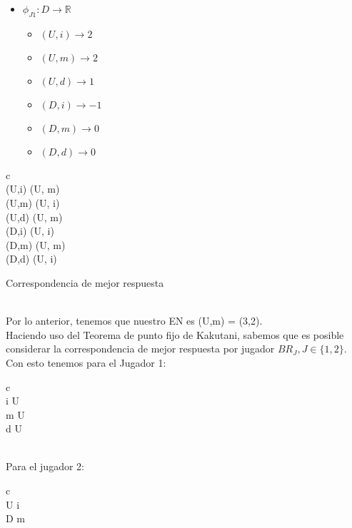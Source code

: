 \documentclass{homework}
\begin{document}
\begin{enumerate}
\begin{itemize}
            \item $\phi_{J1} : D \rightarrow \mathbb R$
            \begin{itemize}
                \item $(U,i) \rightarrow 2$
                \item $(U,m) \rightarrow 2$ 
                \item $(U,d) \rightarrow 1$ 
                \item $(D,i) \rightarrow -1$
                \item $(D,m) \rightarrow 0$
                \item $(D,d) \rightarrow 0$
            \end{itemize}
            
        \end{itemize}
        
\begin{center}
\begin{tabular}{ c   }
 \\ \hline
(U,i) \longrightarrow (U, m) \\
(U,m) \longrightarrow (U, i) \\
(U,d) \longrightarrow (U, m) \\
(D,i) \longrightarrow (U, i) \\
(D,m) \longrightarrow (U, m) \\
(D,d) \longrightarrow (U, i) \\
\end{tabular}
\caption{Correspondencia de mejor respuesta}
\label{tab:respuesta}
\end{center}\\

Por lo anterior, tenemos que nuestro EN es (U,m) = (3,2).\\
Haciendo uso del Teorema de punto fijo de Kakutani, sabemos que es posible considerar la correspondencia de mejor respuesta por jugador $BR_J, J\in \{1,2\}$. Con esto tenemos para el Jugador 1:

\begin{center}
\begin{tabular}{c  }
 \\ \hline
i \longrightarrow U \\
m \longrightarrow U \\
d \longrightarrow U \\
\end{tabular}
\end{center}\\
Para el jugador 2:
\begin{center}
\begin{tabular}{c  }
 \\ \hline
U \longrightarrow i \\
D \longrightarrow m \\
\end{tabular}
\end{center}\\
\end{enumerate}
\end{document}
